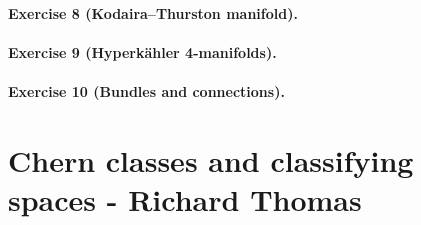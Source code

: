 \documentclass[a4paper]{article}
\theoremstyle{definition}
\theoremstyle{remark}
\begin{document}
\paragraph{Exercise 8 {\normalfont(Kodaira--Thurston manifold)}.} 

\paragraph{Exercise 9 {\normalfont(Hyperk\"ahler 4-manifolds)}.} 

\paragraph{Exercise 10 {\normalfont(Bundles and connections)}.} 

\section{Chern classes and classifying spaces - Richard Thomas}
\end{document}
